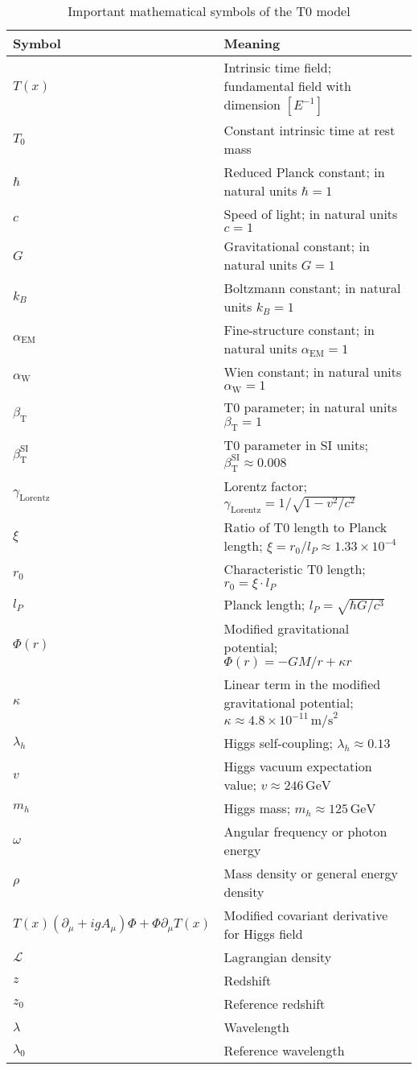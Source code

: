 \documentclass[12pt,a4paper]{article}
\newcommand{\Tfield}{T(x)}
\newcommand{\alphaEM}{\alpha_{\text{EM}}}
\newcommand{\alphaW}{\alpha_{\text{W}}}
\newcommand{\betaT}{\beta_{\text{T}}}
\newcommand{\Tzero}{T_0}
\newcommand{\gammaf}{\gamma_{\text{Lorentz}}}
\newcommand{\DhiggsT}{\Tfield (\partial_\mu + ig A_\mu) \Phi + \Phi \partial_\mu \Tfield}
\begin{document}
	\begin{table}[h]
		\centering
		\begin{tabular}{lp{12cm}}
			\toprule
			\textbf{Symbol} & \textbf{Meaning} \\
			\midrule
			$\Tfield$ & Intrinsic time field; fundamental field with dimension $[E^{-1}]$ \\
			$\Tzero$ & Constant intrinsic time at rest mass \\
			$\hbar$ & Reduced Planck constant; in natural units $\hbar = 1$ \\
			$c$ & Speed of light; in natural units $c = 1$ \\
			$G$ & Gravitational constant; in natural units $G = 1$ \\
			$k_B$ & Boltzmann constant; in natural units $k_B = 1$ \\
			$\alphaEM$ & Fine-structure constant; in natural units $\alphaEM = 1$ \\
			$\alphaW$ & Wien constant; in natural units $\alphaW = 1$ \\
			$\betaT$ & T0 parameter; in natural units $\betaT = 1$ \\
			$\betaT^{\text{SI}}$ & T0 parameter in SI units; $\betaT^{\text{SI}} \approx 0.008$ \\
			$\gammaf$ & Lorentz factor; $\gammaf = 1/\sqrt{1-v^2/c^2}$ \\
			$\xi$ & Ratio of T0 length to Planck length; $\xi = r_0/l_P \approx 1.33 \times 10^{-4}$ \\
			$r_0$ & Characteristic T0 length; $r_0 = \xi \cdot l_P$ \\
			$l_P$ & Planck length; $l_P = \sqrt{\hbar G/c^3}$ \\
			$\Phi(r)$ & Modified gravitational potential; $\Phi(r) = -GM/r + \kappa r$ \\
			$\kappa$ & Linear term in the modified gravitational potential; $\kappa \approx 4.8 \times 10^{-11} \, \text{m/s}^2$ \\
			$\lambda_h$ & Higgs self-coupling; $\lambda_h \approx 0.13$ \\
			$v$ & Higgs vacuum expectation value; $v \approx 246 \, \text{GeV}$ \\
			$m_h$ & Higgs mass; $m_h \approx 125 \, \text{GeV}$ \\
			$\omega$ & Angular frequency or photon energy \\
			$\rho$ & Mass density or general energy density \\
			$\DhiggsT$ & Modified covariant derivative for Higgs field \\
			$\mathcal{L}$ & Lagrangian density \\
			$z$ & Redshift \\
			$z_0$ & Reference redshift \\
			$\lambda$ & Wavelength \\
			$\lambda_0$ & Reference wavelength \\
			\bottomrule
		\end{tabular}
		\caption{Important mathematical symbols of the T0 model}
	\end{table}
	
\end{document}

